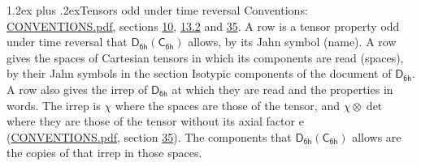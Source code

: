 \documentclass[10pt,a4paper]{article}
\makeatletter
\renewcommand\section{\@startsection{section}{1}{\z@}{-3ex plus -1ex minus -.2ex}%
  {1.2ex plus .2ex}{\normalfont\large\sffamily\bfseries\color{parttitle}}}
\numberwithin{equation}{section}
\newcommand{\grp}[1]{\mathsf{#1}}
\newcommand{\irrprod}{\otimes}
\makeatother
\begin{document}
\section{Tensors odd under time reversal}\label{s:time_odd}
Conventions: \href{../../CONVENTIONS.pdf}{CONVENTIONS.pdf}, sections \href{../../../rotation/CONVENTIONS.pdf\#conv.10}{10}, \href{../../../rotation/CONVENTIONS.pdf\#conv.13.2}{13.2} and \href{../../CONVENTIONS.pdf\#conv.35}{35}.
\leavevmode\label{n:head.name.property}A row is a tensor property odd under time reversal that $\grp{D_{6h}}(\grp{C_{6h}})$ allows, by its Jahn symbol (name). \label{n:head.spaces}A row gives the spaces of Cartesian tensors in which its components are read (spaces), by their Jahn symbols in the section Isotypic components of the document of \href{../../../rotation/data/pdf/D6h.pdf}{$\grp{D_{6h}}$}. \label{n:head.properties}A row also gives the irrep of $\grp{D_{6h}}$ at which they are read and the properties in words. The irrep is $\chi$ where the spaces are those of the tensor, and $\chi \irrprod \det$ where they are those of the tensor without its axial factor e (\href{../../CONVENTIONS.pdf}{CONVENTIONS.pdf}, section \href{../../CONVENTIONS.pdf\#conv.35}{35}). The components that $\grp{D_{6h}}(\grp{C_{6h}})$ allows are the copies of that irrep in those spaces.
\end{document}
